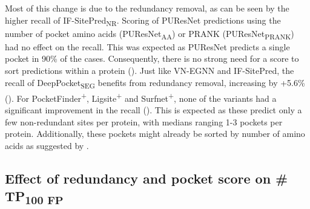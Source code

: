 \noindent
Most of this change is due to the redundancy removal, as can be seen by the higher recall of IF-SitePred\textsubscript{NR}. Scoring of PUResNet predictions using the number of pocket amino acids (PUResNet\textsubscript{AA}) or PRANK (PUResNet\textsubscript{PRANK}) had no effect on the recall. This was expected as PUResNet predicts a single pocket in 90\% of the cases. Consequently, there is no strong need for a score to sort predictions within a protein (). Just like VN-EGNN and IF-SitePred, the recall of DeepPocket\textsubscript{SEG} benefits from redundancy removal, increasing by +5.6\% (). For PocketFinder\textsuperscript{+}, Ligsite\textsuperscript{+} and Surfnet\textsuperscript{+}, none of the variants had a significant improvement in the recall (). This is expected as these predict only a few non-redundant sites per protein, with medians ranging 1-3 pockets per protein. Additionally, these pockets might already be sorted by number of amino acids as suggested by .

\subsection{Effect of redundancy and pocket score on \# TP\textsubscript{100 FP}}

